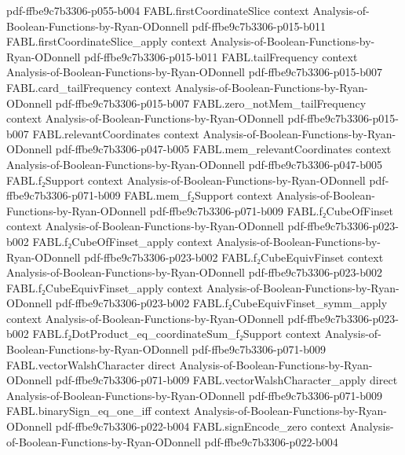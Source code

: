 \begin{theorem}
{    pdf-ffbe9c7b3306-p055-b004}
\proofstep
  {FABL.firstCoordinateSlice}
  {context}
  {Analysis-of-Boolean-Functions-by-Ryan-ODonnell}
  {pdf-ffbe9c7b3306-p015-b011}
\proofstep
  {FABL.firstCoordinateSlice_apply}
  {context}
  {Analysis-of-Boolean-Functions-by-Ryan-ODonnell}
  {pdf-ffbe9c7b3306-p015-b011}
\proofstep
  {FABL.tailFrequency}
  {context}
  {Analysis-of-Boolean-Functions-by-Ryan-ODonnell}
  {pdf-ffbe9c7b3306-p015-b007}
\proofstep
  {FABL.card_tailFrequency}
  {context}
  {Analysis-of-Boolean-Functions-by-Ryan-ODonnell}
  {pdf-ffbe9c7b3306-p015-b007}
\proofstep
  {FABL.zero_notMem_tailFrequency}
  {context}
  {Analysis-of-Boolean-Functions-by-Ryan-ODonnell}
  {pdf-ffbe9c7b3306-p015-b007}
\proofstep
  {FABL.relevantCoordinates}
  {context}
  {Analysis-of-Boolean-Functions-by-Ryan-ODonnell}
  {pdf-ffbe9c7b3306-p047-b005}
\proofstep
  {FABL.mem_relevantCoordinates}
  {context}
  {Analysis-of-Boolean-Functions-by-Ryan-ODonnell}
  {pdf-ffbe9c7b3306-p047-b005}
\proofstep
  {FABL.f₂Support}
  {context}
  {Analysis-of-Boolean-Functions-by-Ryan-ODonnell}
  {pdf-ffbe9c7b3306-p071-b009}
\proofstep
  {FABL.mem_f₂Support}
  {context}
  {Analysis-of-Boolean-Functions-by-Ryan-ODonnell}
  {pdf-ffbe9c7b3306-p071-b009}
\proofstep
  {FABL.f₂CubeOfFinset}
  {context}
  {Analysis-of-Boolean-Functions-by-Ryan-ODonnell}
  {pdf-ffbe9c7b3306-p023-b002}
\proofstep
  {FABL.f₂CubeOfFinset_apply}
  {context}
  {Analysis-of-Boolean-Functions-by-Ryan-ODonnell}
  {pdf-ffbe9c7b3306-p023-b002}
\proofstep
  {FABL.f₂CubeEquivFinset}
  {context}
  {Analysis-of-Boolean-Functions-by-Ryan-ODonnell}
  {pdf-ffbe9c7b3306-p023-b002}
\proofstep
  {FABL.f₂CubeEquivFinset_apply}
  {context}
  {Analysis-of-Boolean-Functions-by-Ryan-ODonnell}
  {pdf-ffbe9c7b3306-p023-b002}
\proofstep
  {FABL.f₂CubeEquivFinset_symm_apply}
  {context}
  {Analysis-of-Boolean-Functions-by-Ryan-ODonnell}
  {pdf-ffbe9c7b3306-p023-b002}
\proofstep
  {FABL.f₂DotProduct_eq_coordinateSum_f₂Support}
  {context}
  {Analysis-of-Boolean-Functions-by-Ryan-ODonnell}
  {pdf-ffbe9c7b3306-p071-b009}
\proofstep
  {FABL.vectorWalshCharacter}
  {direct}
  {Analysis-of-Boolean-Functions-by-Ryan-ODonnell}
  {pdf-ffbe9c7b3306-p071-b009}
\proofstep
  {FABL.vectorWalshCharacter_apply}
  {direct}
  {Analysis-of-Boolean-Functions-by-Ryan-ODonnell}
  {pdf-ffbe9c7b3306-p071-b009}
\proofstep
  {FABL.binarySign_eq_one_iff}
  {context}
  {Analysis-of-Boolean-Functions-by-Ryan-ODonnell}
  {pdf-ffbe9c7b3306-p022-b004}
\proofstep
  {FABL.signEncode_zero}
  {context}
  {Analysis-of-Boolean-Functions-by-Ryan-ODonnell}
  {pdf-ffbe9c7b3306-p022-b004}

\end{theorem}
